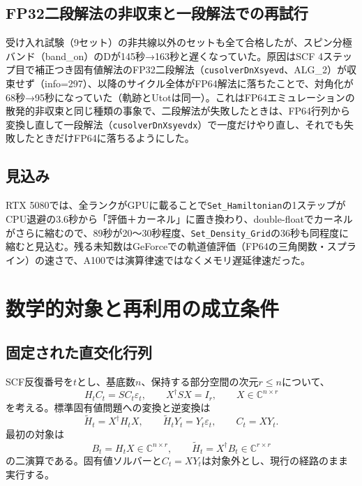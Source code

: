 \documentclass[a4paper,11pt]{ltjsarticle}
\newcommand{\code}[1]{\texttt{#1}}
\begin{document}
\subsection{FP32二段解法の非収束と一段解法での再試行}
受け入れ試験（9セット）の非共線以外のセットも全て合格したが、スピン分極バンド（band\_on）のDが145秒→163秒と遅くなっていた。原因はSCF 4ステップ目で補正つき固有値解法のFP32二段解法（\code{cusolverDnXsyevd}、ALG\_2）が収束せず（info=297）、以降のサイクル全体がFP64解法に落ちたことで、対角化が68秒→95秒になっていた（軌跡とUtotは同一）。これはFP64エミュレーションの散発的非収束と同じ種類の事象で、二段解法が失敗したときは、FP64行列から変換し直して一段解法（\code{cusolverDnXsyevdx}）で一度だけやり直し、それでも失敗したときだけFP64に落ちるようにした。

\subsection{見込み}
RTX 5080では、全ランクがGPUに載ることで\code{Set\_Hamiltonian}の1ステップがCPU退避の3.6秒から「評価＋カーネル」に置き換わり、double-floatでカーネルがさらに縮むので、89秒が20〜30秒程度、\code{Set\_Density\_Grid}の36秒も同程度に縮むと見込む。残る未知数はGeForceでの軌道値評価（FP64の三角関数・スプライン）の速さで、A100では演算律速ではなくメモリ遅延律速だった。

\section{数学的対象と再利用の成立条件}
\subsection{固定された直交化行列}
SCF反復番号を$t$とし、基底数$n$、保持する部分空間の次元$r\le n$について、
\begin{equation}
 H_tC_t=SC_t\varepsilon_t,\qquad
 X^\dagger SX=I_r,\qquad X\in\mathbb C^{n\times r}
\end{equation}
を考える。標準固有値問題への変換と逆変換は
\begin{equation}
 \widetilde H_t=X^\dagger H_tX,\qquad
 \widetilde H_tY_t=Y_t\varepsilon_t,\qquad C_t=XY_t .
 \label{eq:transform}
\end{equation}
最初の対象は
\begin{equation}
 B_t=H_tX\in\mathbb C^{n\times r},\qquad
 \widetilde H_t=X^\dagger B_t\in\mathbb C^{r\times r}
 \label{eq:two_gemm}
\end{equation}
の二演算である。固有値ソルバーと$C_t=XY_t$は対象外とし、現行の経路のまま実行する。
\end{document}
